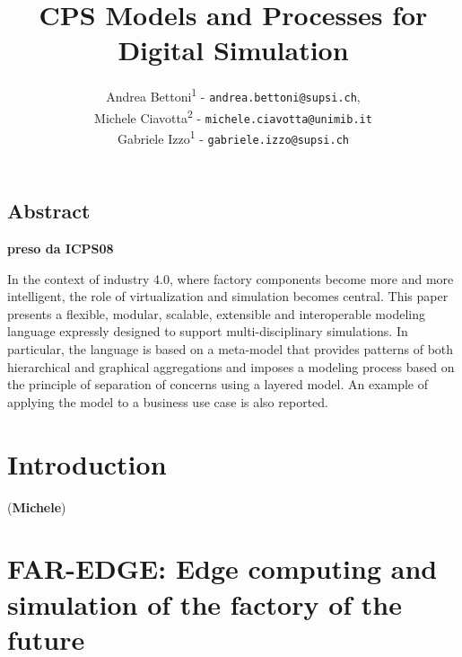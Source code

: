 \documentclass{riverk}
\begin{document}
\setcounter{article}{7}

\begin{opening}
\title[CPS Models and Processes for Digital Simulation]{CPS Models and Processes for Digital Simulation %
            }
\author{Andrea Bettoni\textsuperscript{1} - \texttt{andrea.bettoni@supsi.ch},\\
	Michele Ciavotta\textsuperscript{2} - \texttt{michele.ciavotta@unimib.it}\\
	Gabriele Izzo\textsuperscript{1} - \texttt{gabriele.izzo@supsi.ch}}
\end{opening}

\subsection*{Abstract}
\textbf{preso da ICPS08}

In the context of industry 4.0, where factory components become more and more intelligent, the role of virtualization and simulation becomes central. This paper presents a flexible, modular, scalable, extensible and interoperable modeling language expressly designed to support multi-disciplinary simulations. In particular, the language is based on a meta-model that provides patterns of both hierarchical and graphical aggregations and imposes a modeling process based on the principle of separation of concerns using a layered model. An example of applying the model to a business use case is also reported. 


\section{Introduction} 
(\textbf{Michele})


\section{FAR-EDGE: Edge computing and simulation of the factory of the future }
\end{document}

